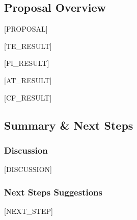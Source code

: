 \subsection{Proposal Overview}
[PROPOSAL]

[TE_RESULT]

[FI_RESULT]

[AT_RESULT]

[CF_RESULT]

\subsection{Summary \& Next Steps}
\subsubsection{Discussion}

[DISCUSSION]


\subsubsection{Next Steps Suggestions}

[NEXT_STEP]
